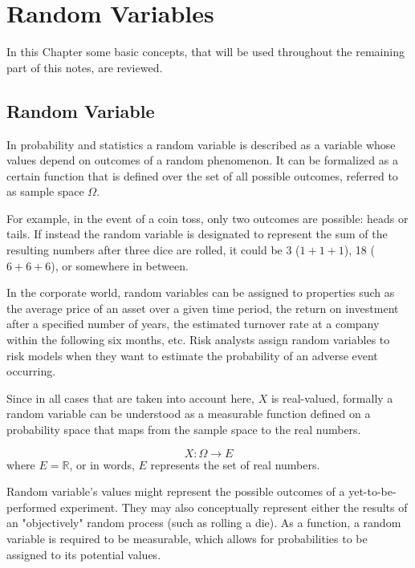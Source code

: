 \chapter{Random Variables}
\label{fundamentals}

In this Chapter some basic concepts, that will be used throughout the remaining part of this notes, are reviewed.

\section{Random Variable}
\label{random-variables}

In probability and statistics a random variable is described as a variable whose values depend on outcomes of a random phenomenon. 
It can be formalized as a certain function that is defined over the set of all possible outcomes, referred to as sample space $\Omega$. 

For example, in the event of a coin toss, only two outcomes are possible: heads or tails. If instead the random variable is designated to represent the sum of the resulting numbers after three dice are rolled, it could be 3 ($1 + 1+ 1$), 18 ($6 + 6 + 6$), or somewhere in between.

In the corporate world, random variables can be assigned to properties such as the average price of an asset over a given time period, the return on investment after a specified number of years, the estimated turnover rate at a company within the following six months, etc. Risk analysts assign random variables to risk models when they want to estimate the probability of an adverse event occurring. 

Since in all cases that are taken into account here, $X$ is real-valued, formally a random variable can be understood as a measurable function defined on a probability space that maps from the sample space to the real numbers.

\begin{equation}
X:\Omega \rightarrow E
\end{equation}
where $E=\mathbb {R}$, or in words, $E$ represents the set of real numbers. 

Random variable's values might represent the possible outcomes of a yet-to-be-performed experiment. They may also conceptually represent either the results of an "objectively" random process (such as rolling a die). As a function, a random variable is required to be measurable, which allows for probabilities to be assigned to its potential values. 

